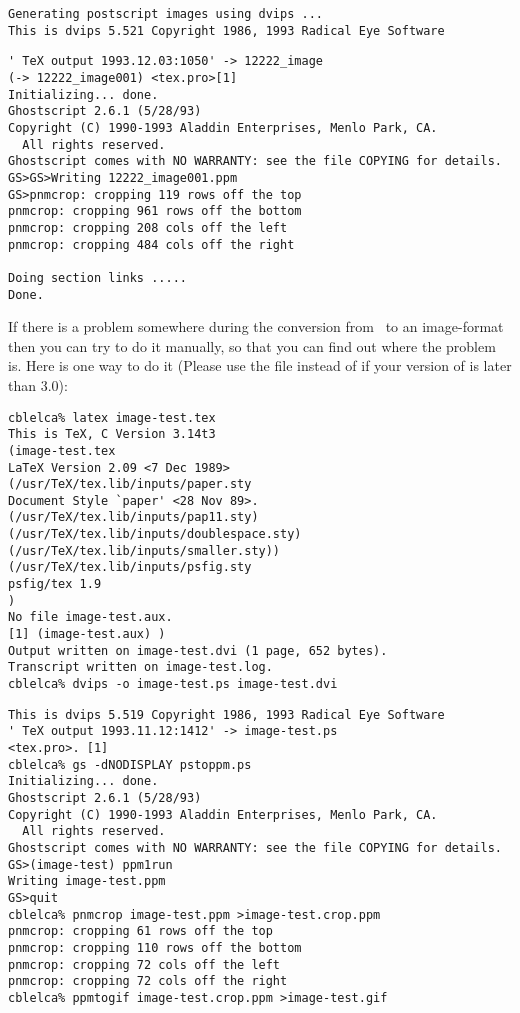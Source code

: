 \begin{htmllist}
\begin{small}
\begin{verbatim}
Generating postscript images using dvips ...
This is dvips 5.521 Copyright 1986, 1993 Radical Eye Software
\end{verbatim}
\begin{verbatim}
' TeX output 1993.12.03:1050' -> 12222_image
(-> 12222_image001) <tex.pro>[1] 
Initializing... done.
Ghostscript 2.6.1 (5/28/93)
Copyright (C) 1990-1993 Aladdin Enterprises, Menlo Park, CA.
  All rights reserved.
Ghostscript comes with NO WARRANTY: see the file COPYING for details.
GS>GS>Writing 12222_image001.ppm
GS>pnmcrop: cropping 119 rows off the top
pnmcrop: cropping 961 rows off the bottom
pnmcrop: cropping 208 cols off the left
pnmcrop: cropping 484 cols off the right

Doing section links .....
Done.
\end{verbatim}
\end{small}


If there is a problem somewhere during the conversion from \PS\ 
to an image-format then you can try to do it manually,
so that you can find out where the problem is. 
Here is one way to do it (Please use the 
file instead of  if your version of  is
later than 3.0):
%
\begin{small}
\begin{verbatim}
cblelca% latex image-test.tex
This is TeX, C Version 3.14t3
(image-test.tex
LaTeX Version 2.09 <7 Dec 1989>
(/usr/TeX/tex.lib/inputs/paper.sty
Document Style `paper' <28 Nov 89>.
(/usr/TeX/tex.lib/inputs/pap11.sty) 
(/usr/TeX/tex.lib/inputs/doublespace.sty)
(/usr/TeX/tex.lib/inputs/smaller.sty)) 
(/usr/TeX/tex.lib/inputs/psfig.sty
psfig/tex 1.9
)
No file image-test.aux.
[1] (image-test.aux) )
Output written on image-test.dvi (1 page, 652 bytes).
Transcript written on image-test.log.
cblelca% dvips -o image-test.ps image-test.dvi
\end{verbatim}
\begin{verbatim}
This is dvips 5.519 Copyright 1986, 1993 Radical Eye Software
' TeX output 1993.11.12:1412' -> image-test.ps
<tex.pro>. [1] 
cblelca% gs -dNODISPLAY pstoppm.ps
Initializing... done.
Ghostscript 2.6.1 (5/28/93)
Copyright (C) 1990-1993 Aladdin Enterprises, Menlo Park, CA.
  All rights reserved.
Ghostscript comes with NO WARRANTY: see the file COPYING for details.
GS>(image-test) ppm1run 
Writing image-test.ppm
GS>quit
cblelca% pnmcrop image-test.ppm >image-test.crop.ppm
pnmcrop: cropping 61 rows off the top
pnmcrop: cropping 110 rows off the bottom
pnmcrop: cropping 72 cols off the left
pnmcrop: cropping 72 cols off the right
cblelca% ppmtogif image-test.crop.ppm >image-test.gif
\end{verbatim}
\end{small}


\end{htmllist}
